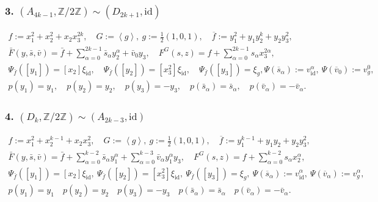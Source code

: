 \documentclass[reqno,12pt]{amsart}
\numberwithin{equation}{section}
\theoremstyle{plain}
\theoremstyle{definition}
\newcommand{\ZZ}{{\mathbb{Z}}}
\newcommand{\id}{\mathrm{id}}
\numberwithin{equation}{section}
\begin{document}
\subsubsection*{\textbf{3.} $(A_{4k-1}, \ZZ/2\ZZ) \sim (D_{2k+1}, \id)$}
\begin{gather*}
f:=x_1^{2}+x_2^2+x_2x_3^{2k},\quad G:=\left<g\right>,\ g:=\frac{1}{2}(1,0,1), \quad \overline{f}:=y_1^2+y_1y_2^k+y_2y_3^2,
\\
\bar{F} (y, \bar{s}, \bar{v}) = \bar{f} + \sum^{2k-1}_{\alpha = 0} \bar{s}_\alpha y_2^\alpha  + \bar{v}_0y_3, \quad F^G(s,z) = f + \sum_{\alpha = 0}^{2k-1} s_\alpha x_3^{2\alpha},
\\
\Psi_{\bar{f}}([y_1]) = [x_2]\xi_{\id}, \quad \Psi_{\bar{f}}([y_2]) = [x_3^2]\xi_{\id}, \quad \Psi_{\bar{f}}([y_3]) = \xi_{g},
\Psi (\overline s_\alpha) := v_\id^{\alpha}, \ \Psi (\overline v_0) := v_g^{0},
\\
p(y_1) = y_1,\quad p(y_2) = y_2, \quad p(y_3) = -y_3, \quad p(\bar{s}_\alpha) = \bar{s}_\alpha, \quad p(\bar{v}_\alpha) = - \bar{v}_\alpha.
\end{gather*}

\subsubsection*{\textbf{4.} $(D_{k}, \ZZ/2\ZZ) \sim (A_{2k-3}, \id)$ }
\begin{gather*}
f:=x_1^{2}+x_2^{k-1}+x_2x_3^2,\quad G:=\left<g\right>,\ g:=\frac{1}{2}(1,0,1), \quad \overline{f}:=y_1^{k-1}+y_1y_2+y_2y_3^2,
\\
\bar{F} (y, \bar{s}, \bar{v}) = \bar{f} + \sum_{\alpha=0}^{k-2} \bar{s}_\alpha y_1^\alpha +  \sum_{\alpha=0}^{k-3} \bar{v}_\alpha y_1^\alpha y_3, \quad F^G(s,z) = f + \sum_{\alpha=0}^{k-2} s_\alpha x_2^{\alpha},
\\
\Psi_{\bar{f}}([y_1]) = [x_2]\xi_{\id}, \ \Psi_{\bar{f}}([y_2]) = [x_3^2]\xi_{\id}, \ \Psi_{\bar{f}}([y_3]) = \xi_{g}, \
\Psi (\overline s_\alpha) := v_\id^{\alpha}, \ \Psi (\overline v_\alpha) := v_g^{\alpha},
\\
p(y_1) = y_1\quad p(y_2) = y_2 \quad p(y_3) = -y_3 \quad p(\bar{s}_\alpha) = \bar{s}_\alpha\quad p(\bar{v}_\alpha) = - \bar{v}_\alpha.
\end{gather*}
\end{document}
